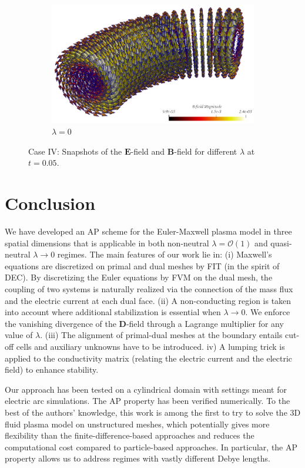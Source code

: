 \documentclass{article}
\begin{document}
\begin{figure}
\begin{subfigure}[b]{\textwidth}
        \includegraphics[scale=0.3]{paper_version/B-field_lamnbda-0_bend.png}
        \caption{\colorbox{yellow!30}{$\lambda = 0$}}
    \end{subfigure}
    \caption{Case IV: Snapshots of the $\mathbf{E}$-field and $\mathbf{B}$-field for different $\lambda$ at $t = 0.05$.}
    \label{fig:3d_vec_field_E_B_bend}
\end{figure}

\section{Conclusion}

We have developed an AP scheme for the Euler-Maxwell plasma model in three spatial
dimensions that is applicable in both non-neutral $\lambda = \mathcal{O}(1)$ and
quasi-neutral $\lambda \rightarrow 0$ regimes. The main features of our work lie in: (i)
Maxwell's equations are discretized on primal and dual meshes by FIT (in the spirit of
DEC). By discretizing the Euler equations by FVM on the dual mesh, the coupling of two systems
is naturally realized via the connection of the mass flux and the electric current at each
dual face. (ii) A non-conducting region is taken into account where additional
stabilization is essential when $\lambda \rightarrow 0$. We enforce the vanishing
divergence of the $\mathbf{D}$-field through a Lagrange multiplier for any value of
$\lambda$. (iii) The alignment of primal-dual meshes at the boundary entails cut-off cells
and auxiliary unknowns have to be introduced. iv) A lumping trick is applied to the
conductivity matrix (relating the electric current and the electric field) to enhance
stability.

Our approach has been tested on a cylindrical domain with settings meant for electric arc
simulations. The AP property has been verified numerically. To the best of the authors'
knowledge, this work is among the first to try to solve the 3D fluid plasma model on
unstructured meshes, which potentially gives more flexibility than the
finite-difference-based approaches and reduces the computational cost compared to
particle-based approaches. In particular, the AP property allows us to address regimes
with vastly different Debye lengths.


\end{document}
